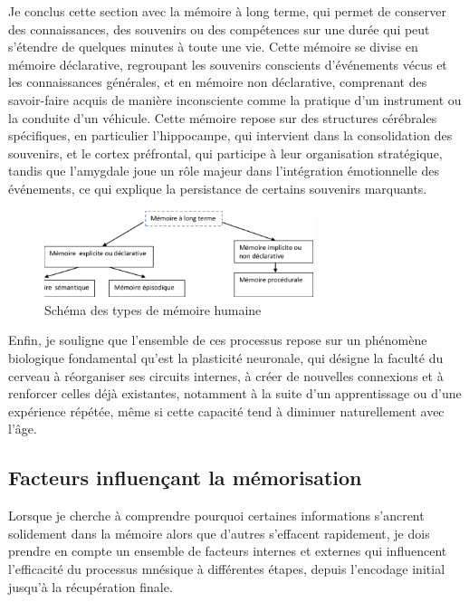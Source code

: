 \documentclass[11pt,a4paper]{report}
\begin{document}
Je conclus cette section avec la mémoire à long terme, qui permet de conserver des connaissances, des souvenirs ou des compétences sur une durée qui peut s’étendre de quelques minutes à toute une vie. Cette mémoire se divise en mémoire déclarative, regroupant les souvenirs conscients d’événements vécus et les connaissances générales, et en mémoire non déclarative, comprenant des savoir-faire acquis de manière inconsciente comme la pratique d’un instrument ou la conduite d’un véhicule. Cette mémoire repose sur des structures cérébrales spécifiques, en particulier l’hippocampe, qui intervient dans la consolidation des souvenirs, et le cortex préfrontal, qui participe à leur organisation stratégique, tandis que l’amygdale joue un rôle majeur dans l’intégration émotionnelle des événements, ce qui explique la persistance de certains souvenirs marquants.

\begin{figure}[h]
    \centering
    \includegraphics[width=0.7\textwidth]{images/1.1.1.png}
    \caption{Schéma des types de mémoire humaine}
    \label{fig:1.1.1}
\end{figure}

Enfin, je souligne que l’ensemble de ces processus repose sur un phénomène biologique fondamental qu’est la plasticité neuronale, qui désigne la faculté du cerveau à réorganiser ses circuits internes, à créer de nouvelles connexions et à renforcer celles déjà existantes, notamment à la suite d’un apprentissage ou d’une expérience répétée, même si cette capacité tend à diminuer naturellement avec l’âge. 

\subsection{Facteurs influençant la mémorisation}

Lorsque je cherche à comprendre pourquoi certaines informations s’ancrent solidement dans la mémoire alors que d’autres s’effacent rapidement, je dois prendre en compte un ensemble de facteurs internes et externes qui influencent l’efficacité du processus mnésique à différentes étapes, depuis l’encodage initial jusqu’à la récupération finale.
\end{document}
